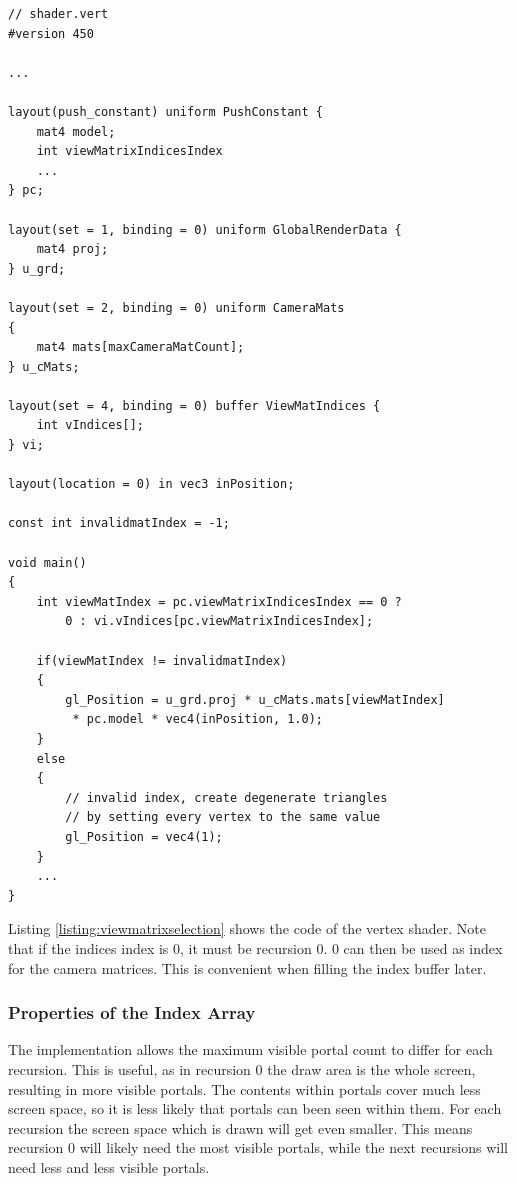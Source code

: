 \begin{lstlisting}[caption={View Matrix Selection}, label=listing:viewmatrixselection]
// shader.vert
#version 450

...

layout(push_constant) uniform PushConstant {	
	mat4 model;
	int viewMatrixIndicesIndex
	...
} pc;

layout(set = 1, binding = 0) uniform GlobalRenderData {
	mat4 proj;
} u_grd;

layout(set = 2, binding = 0) uniform CameraMats
{
	mat4 mats[maxCameraMatCount];
} u_cMats;

layout(set = 4, binding = 0) buffer ViewMatIndices {
	int vIndices[];
} vi;

layout(location = 0) in vec3 inPosition;

const int invalidmatIndex = -1;

void main()
{
	int viewMatIndex = pc.viewMatrixIndicesIndex == 0 ? 
		0 : vi.vIndices[pc.viewMatrixIndicesIndex];
	
	if(viewMatIndex != invalidmatIndex)
	{
		gl_Position = u_grd.proj * u_cMats.mats[viewMatIndex]
		 * pc.model * vec4(inPosition, 1.0);
	}
	else
	{
		// invalid index, create degenerate triangles
		// by setting every vertex to the same value
		gl_Position = vec4(1);
	}
	...
}

\end{lstlisting}

Listing \ref{listing:viewmatrixselection} shows the code of the vertex shader. Note that if the indices index is 0, it must be recursion 0. 0 can then be used as index for the camera matrices. This is convenient when filling the index buffer later.

\subsubsection{Properties of the Index Array}
\label{section:indexarrayproperties}

The implementation allows the maximum visible portal count to differ for each recursion. This is useful, as in recursion 0 the draw area is the whole screen, resulting in more visible portals. The contents within portals cover much less screen space, so it is less likely that portals can been seen within them. For each recursion the screen space which is drawn will get even smaller. This means recursion 0 will likely need the most visible portals, while the next recursions will need less and less visible portals.

